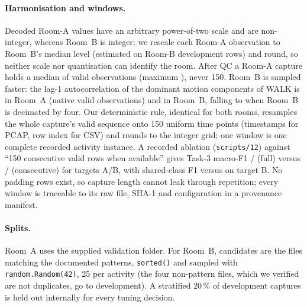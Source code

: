 \documentclass[11pt]{article}
\begin{document}
\paragraph{Harmonisation and windows.} Decoded Room-A values have an arbitrary power-of-two scale and are
non-integer, whereas Room~B is integer; we rescale each Room-A observation to Room~B's median level
(estimated on Room-B development rows) and round, so neither scale nor quantisation can identify the room.
After QC a Room-A capture holds a median of \qcAvalidmed{} valid observations (maximum \qcAvalidmax{}),
never 150. Room~B is sampled faster: the lag-1 autocorrelation of the dominant motion components of
WALK is \insLagA{} in Room~A (native valid observations) and \insLagBone{} in Room~B, falling to \insLagBfour{}
when Room~B is decimated by four. Our deterministic rule, identical for both rooms, resamples the whole
capture's valid sequence onto 150 uniform time points (timestamps for PCAP, row index for CSV) and rounds
to the integer grid; one window is one complete recorded activity instance. A recorded ablation
(\texttt{scripts/12}) against ``150 consecutive valid rows when available'' gives Task-3 macro-F1
\winFullA/\winFullB{} (full) versus \winConsecA/\winConsecB{} (consecutive) for targets A/B, with shared-class
F1 \winFullShB{} versus \winConsecShB{} on target B. No padding rows exist, so capture length cannot leak through
repetition; every window is traceable to its raw file, SHA-1 and configuration in a provenance manifest.

\paragraph{Splits.} Room~A uses the supplied validation folder. For Room~B, candidates are the files
matching the documented patterns, \texttt{sorted()} and sampled with \texttt{random.Random(42)},
25 per activity (the four non-pattern files, which we verified are not duplicates, go to development).
A stratified 20\,\% of development captures is held out internally for every tuning decision.
\end{document}

